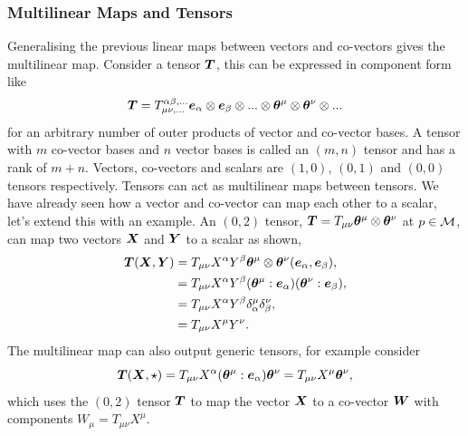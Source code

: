 \subsubsection{Multilinear Maps and Tensors}
Generalising the previous linear maps between vectors and co-vectors gives the multilinear map. Consider a tensor $\boldsymbol{T}$, this can be expressed in component form like 
\begin{equation}\boldsymbol{T} = T^{\alpha\beta, ...}_{\mu\nu,...} \boldsymbol{e}_\alpha\otimes\boldsymbol{e}_\beta \otimes... \otimes\boldsymbol{\theta}^\mu \otimes\boldsymbol{\theta}^\nu\otimes...
\end{equation}
for an arbitrary number of outer products of vector and co-vector bases. A tensor with $m$ co-vector bases and $n$ vector bases is called an $(m,n)$ tensor and has a rank of $m+n$. Vectors, co-vectors and scalars are $(1,0)$, $(0,1)$ and $(0,0)$ tensors respectively.  Tensors can act as multilinear maps between tensors. We have already seen how a vector and co-vector can map each other to a scalar, let's extend this with an example. An $(0,2)$ tensor, $\boldsymbol{T}=T_{\mu\nu}\boldsymbol{\theta}^\mu\otimes\boldsymbol{\theta}^\nu$ at $p\in\mathcal{M}$, can map two vectors $\boldsymbol{X}$ and $\boldsymbol{Y}$ to a scalar as shown, 
\begin{align}
\boldsymbol{T}(\boldsymbol{X},\boldsymbol{Y}) 
&=T_{\mu\nu}X^\alpha Y^\beta \boldsymbol{\theta}^\mu \otimes \boldsymbol{\theta}^\nu (\boldsymbol{e}_\alpha,\boldsymbol{e}_\beta),\\
&= T_{\mu\nu}X^\alpha Y^\beta (\boldsymbol{\theta}^\mu:\boldsymbol{e}_\alpha)( \boldsymbol{\theta}^\nu:\boldsymbol{e}_\beta) ,\\
&= T_{\mu\nu}X^\alpha Y^\beta \delta^\mu_\alpha  \delta^\nu_\beta ,\\
&= T_{\mu\nu}X^\mu Y^\nu.
\end{align}
The multilinear map can also output generic tensors, for example consider 
\begin{equation}
\boldsymbol{T}(\boldsymbol{X},\star) = T_{\mu\nu} X^\alpha (\boldsymbol{\theta}^\mu:\boldsymbol{e}_\alpha)\boldsymbol{\theta}^\nu = T_{\mu\nu}X^\mu \boldsymbol{\theta}^\nu,
\end{equation}
which uses the $(0,2)$ tensor $\boldsymbol{T}$ to map the vector $\boldsymbol{X}$ to a co-vector $\boldsymbol{W}$ with components $W_\mu = T_{\mu\nu}X^\mu$.


